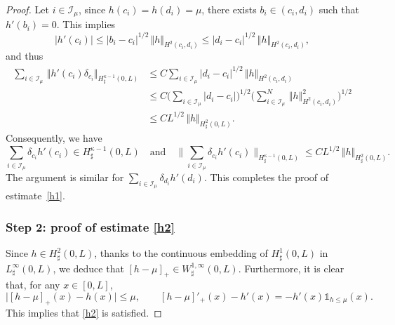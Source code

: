 \documentclass[10pt]{amsart}
\let\mathcal\mathscr
\theoremstyle{remark}
\theoremstyle{definition}
\newcommand{\norme}[1]{\,\Vert #1\Vert}
\begin{document}
\begin{proof}
Let $i \in \mathcal I_{\mu}$, since $h(c_{i})=h(d_{i})=\mu$, there exists $b_{i}\in(c_{i},d_{i})$ such that $h'(b_{i})=0$. This implies
\[\vert h'(c_{i})\vert\leq \vert b_{i}-c_{i}\vert^{1/2}\norme{h}_{H^{2}(c_{i},d_{i})} \leq \vert d_{i}-c_{i}\vert^{1/2}\norme{h}_{H^{2}(c_{i},d_{i})},\]
and thus
\begin{equation}\label{regularity.second.derivative}
\begin{aligned}
\sum_{i \in \mathcal I_{\mu}} \norme{h'(c_{i})\delta_{c_{i}}}_{H_\sharp^{\kappa-1}(0,L)}&{}\leq C\sum_{i \in \mathcal I_{\mu}}\vert d_{i}-c_{i}\vert^{1/2}\norme{h}_{H^{2}(c_{i},d_{i})}\\
&\leq C\biggl(\sum_{i \in \mathcal I_{\mu}} \vert d_{i}-c_{i}\vert\biggr)^{1/2}\biggl(\sum_{i \in \mathcal I_{\mu}}^{N}\norme{h}_{H^{2}(c_{i},d_{i})}^{2}\biggr)^{1/2}\\
&\leq CL^{1/2}\norme{h}_{H_\sharp^{2}(0,L)}.
\end{aligned}
\end{equation}
Consequently, we have
\[
\sum_{i\in \mathcal I_{\mu}}\delta_{c_{i} }h{'}(c_{i}) \in H^{\kappa -1}_{\sharp}(0,L) \quad\text{and}\quad \biggl\|\sum_{i\in \mathcal I_{\mu}}\delta_{c_{i} }h{'}(c_{i})\biggr\|_{H^{\kappa -1}_{\sharp}(0,L)} \leq CL^{1/2}\norme{h}_{H_\sharp^{2}(0,L)}.
\]
The argument is similar for $\sum_{i\in \mathcal I_{\mu}}\delta_{d_{i}}h'(d_{i})$. This completes the proof of estimate~\eqref{h1}.

\subsubsection*{Step 2: proof of estimate \eqref{h2}} Since $h\in H_\sharp^2(0, L)$, thanks to the continuous embedding of $H_\sharp^1(0, L)$ in $L_\sharp^\infty(0, L)$, we deduce that $[h-\mu]_{+}\in W_\sharp^{1,\infty}(0, L)$.
Furthermore, it is clear that, for any $ x\in [0, L]$,
\[
\vert [h-\mu]_{+}(x)-h(x)\vert \leq \mu, \qquad [h-\mu]'_{+}(x)-h'(x) = -h'(x) \mathds{1}_{h\leq\mu}(x).
\]
This implies that \eqref{h2} is satisfied.
\end{proof}
\end{document}
